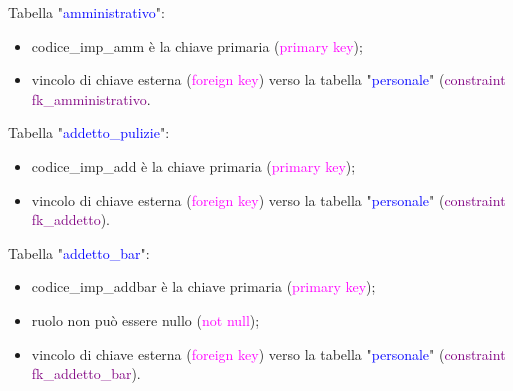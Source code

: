 \documentclass{article}
\begin{document}
    \begin{flushleft}
        Tabella "\textcolor{blue}{amministrativo}": \\
        \begin{itemize} 
            \item codice\_imp\_amm è la chiave primaria (\textcolor{magenta}{primary key}); \\
            \item vincolo di chiave esterna (\textcolor{magenta}{foreign key}) verso la tabella "\textcolor{blue}{personale}" (\textcolor{purple}{constraint fk\_amministrativo}. \\
        \end{itemize}        
    \end{flushleft}

    \begin{flushleft}
        Tabella "\textcolor{blue}{addetto\_pulizie}": \\
        \begin{itemize}
            \item codice\_imp\_add è la chiave primaria (\textcolor{magenta}{primary key}); \\
            \item vincolo di chiave esterna (\textcolor{magenta}{foreign key}) verso la tabella "\textcolor{blue}{personale}" (\textcolor{purple}{constraint fk\_addetto}). \\
        \end{itemize}        
    \end{flushleft}

    \begin{flushleft}
        Tabella "\textcolor{blue}{addetto\_bar}": \\
        \begin{itemize}
            \item codice\_imp\_addbar è la chiave primaria (\textcolor{magenta}{primary key}); \\
            \item ruolo non può essere nullo (\textcolor{magenta}{not null}); \\
            \item vincolo di chiave esterna (\textcolor{magenta}{foreign key}) verso la tabella "\textcolor{blue}{personale}" (\textcolor{purple}{constraint fk\_addetto\_bar}). \\
        \end{itemize}        
    \end{flushleft}
\end{document}

